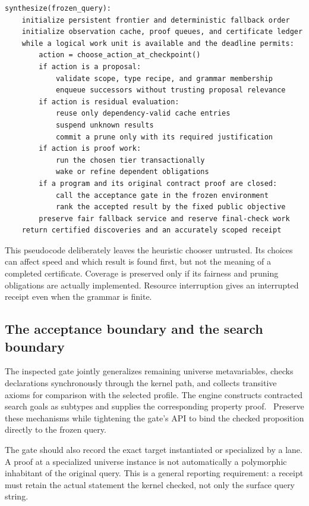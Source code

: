 \documentclass[11pt,a4paper]{article}
\theoremstyle{remark}
\begin{document}
\begin{lstlisting}
synthesize(frozen_query):
    initialize persistent frontier and deterministic fallback order
    initialize observation cache, proof queues, and certificate ledger
    while a logical work unit is available and the deadline permits:
        action = choose_action_at_checkpoint()
        if action is a proposal:
            validate scope, type recipe, and grammar membership
            enqueue successors without trusting proposal relevance
        if action is residual evaluation:
            reuse only dependency-valid cache entries
            suspend unknown results
            commit a prune only with its required justification
        if action is proof work:
            run the chosen tier transactionally
            wake or refine dependent obligations
        if a program and its original contract proof are closed:
            call the acceptance gate in the frozen environment
            rank the accepted result by the fixed public objective
        preserve fair fallback service and reserve final-check work
    return certified discoveries and an accurately scoped receipt
\end{lstlisting}

This pseudocode deliberately leaves the heuristic chooser untrusted. Its choices can affect speed and which result is found first, but not the meaning of a completed certificate. Coverage is preserved only if its fairness and pruning obligations are actually implemented. Resource interruption gives an interrupted receipt even when the grammar is finite.

\subsection{The acceptance boundary and the search boundary}

The inspected gate jointly generalizes remaining universe metavariables, checks declarations synchronously through the kernel path, and collects transitive axioms for comparison with the selected profile. The engine constructs contracted search goals as subtypes and supplies the corresponding property proof.~\cite{gate,engine} Preserve these mechanisms while tightening the gate's API to bind the checked proposition directly to the frozen query.

The gate should also record the exact target instantiated or specialized by a lane. A proof at a specialized universe instance is not automatically a polymorphic inhabitant of the original query. This is a general reporting requirement: a receipt must retain the actual statement the kernel checked, not only the surface query string.
\end{document}
